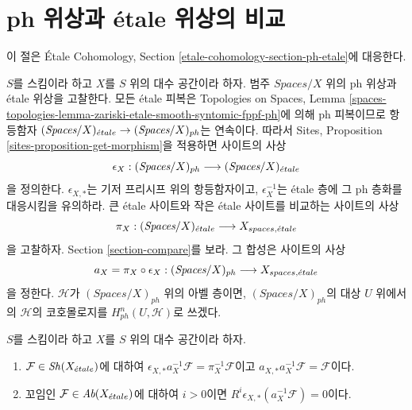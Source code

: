 \section{ph 위상과 \'etale 위상의 비교}
\label{section-ph-etale}

\noindent
이 절은 \'Etale Cohomology, Section
\ref{etale-cohomology-section-ph-etale}에 대응한다.

\medskip\noindent
$S$를 스킴이라 하고 $X$를 $S$ 위의 대수 공간이라 하자.
범주 $\textit{Spaces}/X$ 위의 ph 위상과 \'etale 위상을 고찰한다.
모든 \'etale 피복은 Topologies on Spaces, Lemma
\ref{spaces-topologies-lemma-zariski-etale-smooth-syntomic-fppf-ph}에 의해
ph 피복이므로 항등함자
$(\textit{Spaces}/X)_{\acute{e}tale} \to (\textit{Spaces}/X)_{ph}$는 연속이다.
따라서 Sites, Proposition \ref{sites-proposition-get-morphism}을 적용하면
사이트의 사상
$$
\epsilon_X :
(\textit{Spaces}/X)_{ph} \longrightarrow (\textit{Spaces}/X)_{\acute{e}tale}
$$
을 정의한다. $\epsilon_{X, *}$는 기저 프리시프 위의 항등함자이고,
$\epsilon_X^{-1}$는 \'etale 층에 그 ph 층화를 대응시킴을 유의하라.
큰 \'etale 사이트와 작은 \'etale 사이트를 비교하는 사이트의 사상
$$
\pi_X : (\textit{Spaces}/X)_{\acute{e}tale} \longrightarrow X_{spaces, {\acute{e}tale}}
$$
을 고찰하자. Section \ref{section-compare}를 보라.
그 합성은 사이트의 사상
$$
a_X = \pi_X \circ \epsilon_X :
(\textit{Spaces}/X)_{ph}
\longrightarrow
X_{spaces, {\acute{e}tale}}
$$
을 정한다. $\mathcal{H}$가 $(\textit{Spaces}/X)_{ph}$ 위의 아벨
층이면, $(\textit{Spaces}/X)_{ph}$의 대상 $U$ 위에서의
$\mathcal{H}$의 코호몰로지를 $H^n_{ph}(U, \mathcal{H})$로 쓰겠다.

\begin{lemma}
\label{lemma-comparison-ph-etale}
$S$를 스킴이라 하고 $X$를 $S$ 위의 대수 공간이라 하자.
\begin{enumerate}
\item $\mathcal{F} \in \mathop{\mathit{Sh}}\nolimits(X_{\acute{e}tale})$에 대하여
$\epsilon_{X, *}a_X^{-1}\mathcal{F} = \pi_X^{-1}\mathcal{F}$이고
$a_{X, *}a_X^{-1}\mathcal{F} = \mathcal{F}$이다.
\item 꼬임인 $\mathcal{F} \in \textit{Ab}(X_{\acute{e}tale})$에 대하여
$i > 0$이면 $R^i\epsilon_{X, *}(a_X^{-1}\mathcal{F}) = 0$이다.
\end{enumerate}
\end{lemma}

